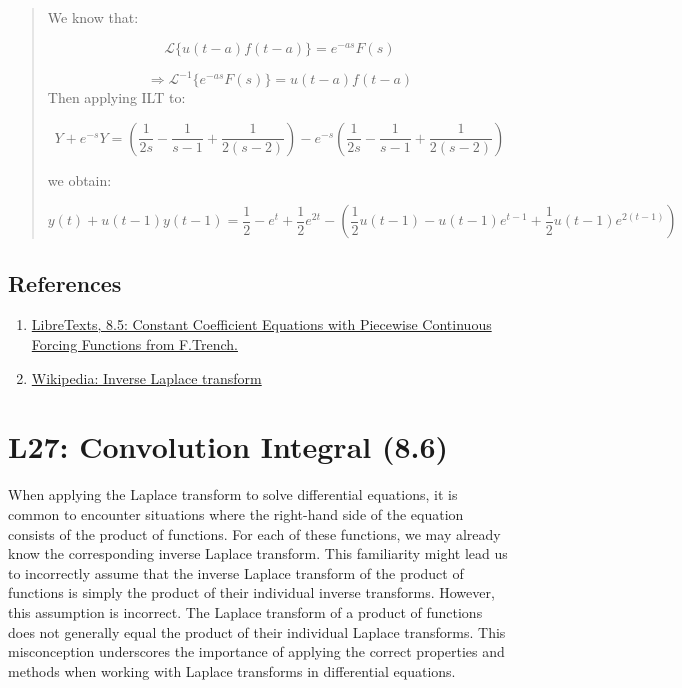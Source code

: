 \documentclass[
  letterpaper,
  DIV=11,
  numbers=noendperiod]{scrreprt}
\theoremstyle{plain}
\theoremstyle{remark}
\begin{document}
\begin{tcolorbox}
\begin{quote}
We know that:

\[\mathscr{L}\{u(t-a)f(t-a)\}=e^{-as}F(s)\]

\[\Rightarrow\boxed{\mathscr{L}^{-1}\{e^{-as}F(s)\}=u(t-a)f(t-a)}\] Then
applying ILT to:

\[Y+e^{-s}Y=\left(\frac{1}{2s}-\frac{1}{s-1}+\frac{1}{2(s-2)}\right)-e^{-s}\left(\frac{1}{2s}-\frac{1}{s-1}+\frac{1}{2(s-2)}\right)\]

we obtain:

\[\boxed{y(t)+u(t-1)y(t-1)=\frac{1}{2} - e^{t}+\frac{1}{2}e^{2t}-\left(\frac{1}{2}u(t-1)-u(t-1)e^{t-1}+\frac{1}{2}u(t-1)e^{2(t-1)}\right)}\]
\end{quote}

\end{tcolorbox}

\section{References}\label{references-8}

\begin{enumerate}
\def\labelenumi{\arabic{enumi}.}
\item
  \href{https://math.libretexts.org/Courses/Monroe_Community_College/MTH_225_Differential_Equations/8\%3A_Laplace_Transforms/8.5\%3A_Constant_Coefficient_Equations_with_Piecewise_Continuous_Forcing_Functions}{LibreTexts,
  8.5: Constant Coefficient Equations with Piecewise Continuous Forcing
  Functions from F.Trench.}
\item
  \href{https://en.wikipedia.org/wiki/Inverse_Laplace_transform}{Wikipedia:
  Inverse Laplace transform}
\end{enumerate}


\chapter{L27: Convolution Integral
(8.6)}\label{l27-convolution-integral-8.6-1}

When applying the Laplace transform to solve differential equations, it
is common to encounter situations where the right-hand side of the
equation consists of the product of functions. For each of these
functions, we may already know the corresponding inverse Laplace
transform. This familiarity might lead us to incorrectly assume that the
inverse Laplace transform of the product of functions is simply the
product of their individual inverse transforms. However, this assumption
is incorrect. The Laplace transform of a product of functions does not
generally equal the product of their individual Laplace transforms. This
misconception underscores the importance of applying the correct
properties and methods when working with Laplace transforms in
differential equations.
\end{document}
